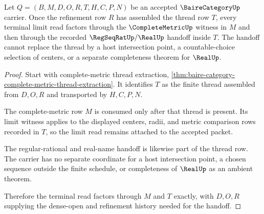\begin{theorem}
\label{thm:baire-category-cauchy-thread-limit-handoff}
Let $Q=(B,M,D,O,R,T,H,C,P,N)$ be an accepted $\BaireCategoryUp$ carrier. Once the refinement row $R$ has assembled the thread row $T$, every terminal limit read factors through the $\CompleteMetricUp$ witness in $M$ and then through the recorded $\RegSeqRatUp/\RealUp$ handoff inside $T$. The handoff cannot replace the thread by a host intersection point, a countable-choice selection of centers, or a separate completeness theorem for $\RealUp$.
\end{theorem}
\begin{proof}
Start with complete-metric thread extraction, \autoref{thm:baire-category-complete-metric-thread-extraction}. It identifies $T$ as the finite thread assembled from $D,O,R$ and transported by $H,C,P,N$.

The complete-metric row $M$ is consumed only after that thread is present. Its limit witness applies to the displayed centers, radii, and metric comparison rows recorded in $T$, so the limit read remains attached to the accepted packet.

The regular-rational and real-name handoff is likewise part of the thread row. The carrier has no separate coordinate for a host intersection point, a chosen sequence outside the finite schedule, or completeness of $\RealUp$ as an ambient theorem.

Therefore the terminal read factors through $M$ and $T$ exactly, with $D,O,R$ supplying the dense-open and refinement history needed for the handoff.
\end{proof}

